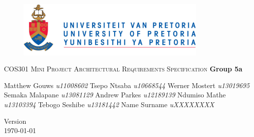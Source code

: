 \begin{titlepage}
\begin{center}
	\begin{figure}[t]
		\centering
		\includegraphics[width=350px]{UP_Logo.png}
	\end{figure}
	
\textsc{\LARGE COS301 Mini Project \newline\newline Architectural Requirements Specification}
		\textbf{\newline Group 5a} \\
		\begin{flushright} \large
			Matthew Gouws \emph{u11008602} \newline
			Tsepo Ntsaba \emph{u10668544} \newline
			Werner Mostert \emph{u13019695} \newline
			Semaka Malapane \emph{u13081129} \newline
			Andrew Parkes \emph{u12189139} \newline
			Ndumiso Mathe \emph{u13103394} \newline
			Tebogo Seshibe \emph{u13181442} \newline
			Name Surname \emph{uXXXXXXXX} \newline
		\end{flushright}
		
		\vfill
		
		{\large Version }
		\\
		{\large \today}
		
\end{center}
\end{titlepage}
